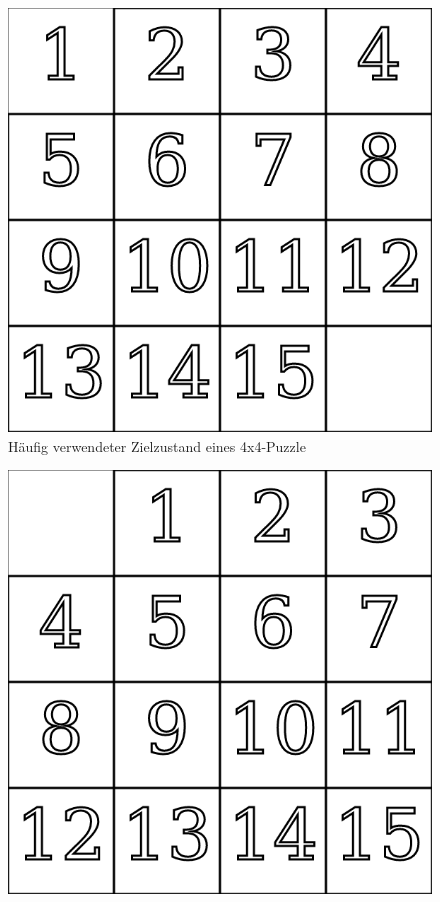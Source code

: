 %
\begin{minipage}{\linewidth}
	\begin{minipage}[t]{0.45\linewidth}
		\begin{figure}[H]
			\centering
			\includegraphics[width=\linewidth,keepaspectratio]{img/End_Puzzle_AO.png}
			\captionsetup{format=plain, indention=0pt}
			\caption{Häufig verwendeter Zielzustand eines 4x4-Puzzle \label{fig:Perm_puzzle_end_allOther}}
		\end{figure}
	\end{minipage}
	\hfill
	\begin{minipage}[t]{0.45\linewidth}
		\begin{figure}[H]
			\centering
			\includegraphics[width=\linewidth,keepaspectratio]{img/End_Puzzle_Stroetmann.png}

\end{figure}
\end{minipage}
\end{minipage}
